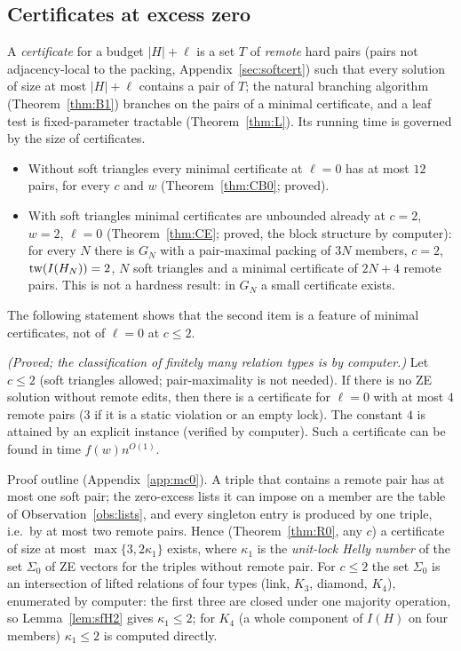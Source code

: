 \subsection{Certificates at excess zero}\label{sec:softcertmain}
A \emph{certificate} for a budget $|H|+\ell$ is a set $T$ of \emph{remote} hard pairs (pairs not adjacency-local to the packing, Appendix~\ref{sec:softcert}) such that every solution of size at most $|H|+\ell$ contains a pair of $T$; the natural branching algorithm (Theorem~\ref{thm:B1}) branches on the pairs of a minimal certificate, and a leaf test is fixed-parameter tractable (Theorem~\ref{thm:L}). Its running time is governed by the size of certificates.
\begin{itemize}
\item Without soft triangles every minimal certificate at $\ell=0$ has at most $12$ pairs, for every $c$ and $w$ (Theorem~\ref{thm:CB0}; proved).
\item With soft triangles minimal certificates are unbounded already at $c=2$, $w=2$, $\ell=0$ (Theorem~\ref{thm:CE}; proved, the block structure by computer): for every $N$ there is $G_N$ with a pair-maximal packing of $3N$ members, $c=2$, $\mathrm{tw}(I(H_N))=2$, $N$ soft triangles and a minimal certificate of $2N+4$ remote pairs. This is not a hardness result: in $G_N$ a small certificate exists.
\end{itemize}
The following statement shows that the second item is a feature of minimal certificates, not of $\ell=0$ at $c\le2$.
\begin{theorem}[Bounded certificates at $\ell=0$, $c\le2$]\label{thm:MC0}
\emph{(Proved; the classification of finitely many relation types is by computer.)} Let $c\le2$ (soft triangles allowed; pair-maximality is not needed). If there is no ZE solution without remote edits, then there is a certificate for $\ell=0$ with at most $4$ remote pairs ($3$ if it is a static violation or an empty lock). The constant $4$ is attained by an explicit instance (verified by computer). Such a certificate can be found in time $f(w)n^{O(1)}$.
\end{theorem}
Proof outline (Appendix~\ref{app:mc0}). A triple that contains a remote pair has at most one soft pair; the zero-excess lists it can impose on a member are the table of Observation~\ref{obs:lists}, and every singleton entry is produced by one triple, i.e.\ by at most two remote pairs. Hence (Theorem~\ref{thm:R0}, any $c$) a certificate of size at most $\max\{3,2\kappa_1\}$ exists, where $\kappa_1$ is the \emph{unit-lock Helly number} of the set $\Sigma_0$ of ZE vectors for the triples without remote pair. For $c\le2$ the set $\Sigma_0$ is an intersection of lifted relations of four types (link, $K_3$, diamond, $K_4$), enumerated by computer: the first three are closed under one majority operation, so Lemma~\ref{lem:sfH2} gives $\kappa_1\le2$; for $K_4$ (a whole component of $I(H)$ on four members) $\kappa_1\le2$ is computed directly.

